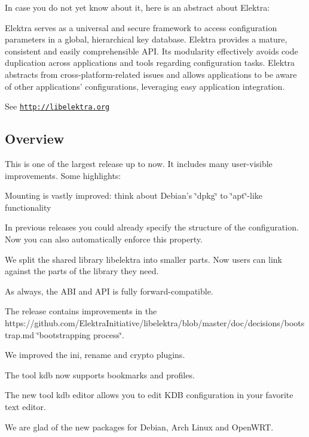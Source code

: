 In case you do not yet know about it, here is an abstract about Elektra\+:

Elektra serves as a universal and secure framework to access configuration parameters in a global, hierarchical key database. Elektra provides a mature, consistent and easily comprehensible A\+P\+I. Its modularity effectively avoids code duplication across applications and tools regarding configuration tasks. Elektra abstracts from cross-\/platform-\/related issues and allows applications to be aware of other applications' configurations, leveraging easy application integration.

See \href{http://libelektra.org}{\tt http\+://libelektra.\+org}

\subsection*{Overview}

This is one of the largest release up to now. It includes many user-\/visible improvements. Some highlights\+:


\begin{DoxyItemize}
\item Mounting is vastly improved\+: think about Debian's \char`\"{}dpkg\char`\"{} to \char`\"{}apt\char`\"{}-\/like functionality
\item In previous releases you could already specify the structure of the configuration. Now you can also automatically enforce this property.
\item We split the shared library {\ttfamily libelektra} into smaller parts. Now users can link against the parts of the library they need.
\item As always, the A\+B\+I and A\+P\+I is fully forward-\/compatible.
\item The release contains improvements in the https\+://github.com/\+Elektra\+Initiative/libelektra/blob/master/doc/decisions/bootstrap.\+md \char`\"{}bootstrapping process\char`\"{}.
\item We improved the {\ttfamily ini}, {\ttfamily rename} and {\ttfamily crypto} plugins.
\item The tool {\ttfamily kdb} now supports bookmarks and profiles.
\item The new tool {\ttfamily kdb editor} allows you to edit K\+D\+B configuration in your favorite text editor.
\item We are glad of the new packages for Debian, Arch Linux and Open\+W\+R\+T.
\end{DoxyItemize}

